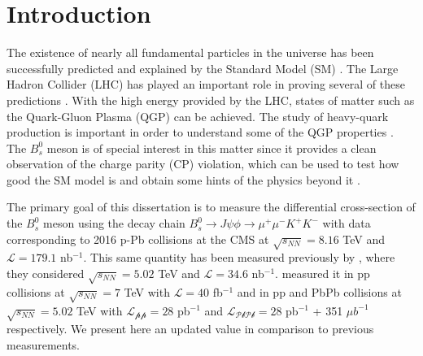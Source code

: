 \chapter*{Introduction}
\label{chap:Introduction}
The existence of nearly all fundamental particles in the universe has been successfully predicted and explained by the Standard Model (SM) \cite{stiller2016full}. The Large Hadron Collider (LHC) has played an important role in proving several of these predictions \cite{baron2018desarrollo}. With the high energy provided by the LHC, states of matter such as the Quark-Gluon Plasma (QGP) can be achieved. The study of heavy-quark production is important in order to understand some of the QGP properties \cite{aziz2021z}. The $B^0_s$ meson is of special interest in this matter since it provides a clean observation of the charge parity (CP) violation, which can be used to test how good the SM model is and obtain some hints of the physics beyond it \cite{greevenanalysis}.

The primary goal of this dissertation is to measure the differential cross-section of the $B^0_s$ meson using the decay chain $B^0_s \to J\psi \phi \to \mu^{+}\mu^{-} K^{+}K^{-}$ with data corresponding to 2016 p-Pb collisions at the CMS at  $\sqrt{s_{NN}} = 8.16$ TeV and $\mathcal{L} = 179.1$ nb$^{-1}$. This same quantity has been measured previously by \cite{khachatryan2016study}, where they considered $\sqrt{s_{NN}} = 5.02$ TeV and $\mathcal{L} = 34.6$ nb$^{-1}$. \cite{chatrchyan2011measurement} measured it in pp collisions at $\sqrt{s_{NN}} = 7$ TeV with $\mathcal{L} = 40$ fb$^{-1}$ and \cite{canelli2019measurement} in pp and PbPb collisions at $\sqrt{s_{NN}} = 5.02$ TeV with $\mathcal{L_{\text{pp}}} = 28$ pb$^{-1}$ and $\mathcal{L_{\text{PbPb}}} = 28$ pb$^{-1}$ + 351 $\mu b^{-1}$ respectively. We present here an updated value in comparison to previous measurements.

